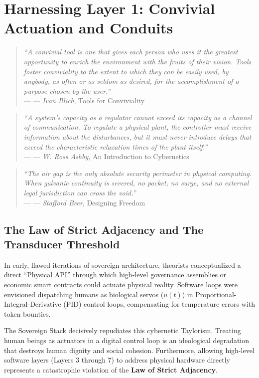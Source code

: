 \chapter{Harnessing Layer 1: Convivial Actuation and Conduits}
\label{chap:harnessing_layer1}

\providecommand{\epigraph}[2]{%
  \begin{quote}
    \textit{#1} \\
    \raggedleft--- #2
  \end{quote}
}

\epigraph{
    ``A convivial tool is one that gives each person who uses it the greatest opportunity to enrich the environment with the fruits of their vision. Tools foster conviviality to the extent to which they can be easily used, by anybody, as often or as seldom as desired, for the accomplishment of a purpose chosen by the user.''
}{--- \textit{Ivan Illich}, \textnormal{Tools for Conviviality} \cite{illich1973conviviality}}

\epigraph{
    ``A system's capacity as a regulator cannot exceed its capacity as a channel of communication. To regulate a physical plant, the controller must receive information about the disturbances, but it must never introduce delays that exceed the characteristic relaxation times of the plant itself.''
}{--- \textit{W. Ross Ashby}, \textnormal{An Introduction to Cybernetics} \cite{ashby1956cybernetics}}

\epigraph{
    ``The air gap is the only absolute security perimeter in physical computing. When galvanic continuity is severed, no packet, no surge, and no external legal jurisdiction can cross the void.''
}{--- \textit{Stafford Beer}, \textnormal{Designing Freedom} \cite{beer1974designing}}

\section{The Law of Strict Adjacency and The Transducer Threshold}

In early, flawed iterations of sovereign architecture, theorists conceptualized a direct ``Physical API'' through which high-level governance assemblies or economic smart contracts could actuate physical reality. Software loops were envisioned dispatching humans as biological servos ($u(t)$) in Proportional-Integral-Derivative (PID) control loops, compensating for temperature errors with token bounties.

The Sovereign Stack decisively repudiates this cybernetic Taylorism. Treating human beings as actuators in a digital control loop is an ideological degradation that destroys human dignity and social cohesion. Furthermore, allowing high-level software layers (Layers 3 through 7) to address physical hardware directly represents a catastrophic violation of the \textbf{Law of Strict Adjacency}.

